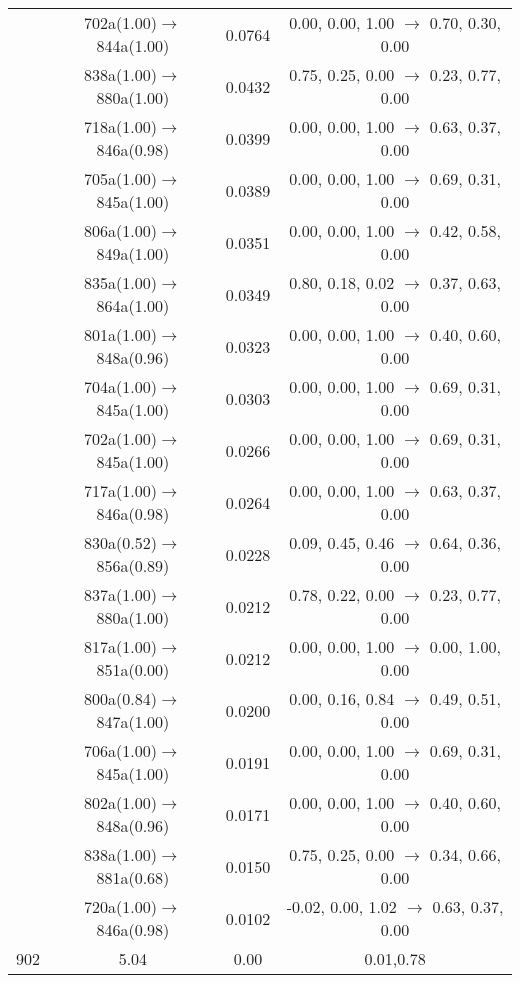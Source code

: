 \documentclass[10pt,a4paper]{article}
\begin{document}
\begin{longtable}{c|c|c|c}
 	& 702a(1.00)$\rightarrow$844a(1.00) &	 0.0764 &	 0.00, 0.00, 1.00 $\rightarrow$ 0.70, 0.30, 0.00 \\ 
 	& 838a(1.00)$\rightarrow$880a(1.00) &	 0.0432 &	 0.75, 0.25, 0.00 $\rightarrow$ 0.23, 0.77, 0.00 \\ 
 	& 718a(1.00)$\rightarrow$846a(0.98) &	 0.0399 &	 0.00, 0.00, 1.00 $\rightarrow$ 0.63, 0.37, 0.00 \\ 
 	& 705a(1.00)$\rightarrow$845a(1.00) &	 0.0389 &	 0.00, 0.00, 1.00 $\rightarrow$ 0.69, 0.31, 0.00 \\ 
 	& 806a(1.00)$\rightarrow$849a(1.00) &	 0.0351 &	 0.00, 0.00, 1.00 $\rightarrow$ 0.42, 0.58, 0.00 \\ 
 	& 835a(1.00)$\rightarrow$864a(1.00) &	 0.0349 &	 0.80, 0.18, 0.02 $\rightarrow$ 0.37, 0.63, 0.00 \\ 
 	& 801a(1.00)$\rightarrow$848a(0.96) &	 0.0323 &	 0.00, 0.00, 1.00 $\rightarrow$ 0.40, 0.60, 0.00 \\ 
 	& 704a(1.00)$\rightarrow$845a(1.00) &	 0.0303 &	 0.00, 0.00, 1.00 $\rightarrow$ 0.69, 0.31, 0.00 \\ 
 	& 702a(1.00)$\rightarrow$845a(1.00) &	 0.0266 &	 0.00, 0.00, 1.00 $\rightarrow$ 0.69, 0.31, 0.00 \\ 
 	& 717a(1.00)$\rightarrow$846a(0.98) &	 0.0264 &	 0.00, 0.00, 1.00 $\rightarrow$ 0.63, 0.37, 0.00 \\ 
 	& 830a(0.52)$\rightarrow$856a(0.89) &	 0.0228 &	 0.09, 0.45, 0.46 $\rightarrow$ 0.64, 0.36, 0.00 \\ 
 	& 837a(1.00)$\rightarrow$880a(1.00) &	 0.0212 &	 0.78, 0.22, 0.00 $\rightarrow$ 0.23, 0.77, 0.00 \\ 
 	& 817a(1.00)$\rightarrow$851a(0.00) &	 0.0212 &	 0.00, 0.00, 1.00 $\rightarrow$ 0.00, 1.00, 0.00 \\ 
 	& 800a(0.84)$\rightarrow$847a(1.00) &	 0.0200 &	 0.00, 0.16, 0.84 $\rightarrow$ 0.49, 0.51, 0.00 \\ 
 	& 706a(1.00)$\rightarrow$845a(1.00) &	 0.0191 &	 0.00, 0.00, 1.00 $\rightarrow$ 0.69, 0.31, 0.00 \\ 
 	& 802a(1.00)$\rightarrow$848a(0.96) &	 0.0171 &	 0.00, 0.00, 1.00 $\rightarrow$ 0.40, 0.60, 0.00 \\ 
 	& 838a(1.00)$\rightarrow$881a(0.68) &	 0.0150 &	 0.75, 0.25, 0.00 $\rightarrow$ 0.34, 0.66, 0.00 \\ 
 	& 720a(1.00)$\rightarrow$846a(0.98) &	 0.0102 &	 -0.02, 0.00, 1.02 $\rightarrow$ 0.63, 0.37, 0.00 \\ 
 \hline902 &	 5.04 &	 0.00 &	 0.01,0.78 \\ 

\end{longtable}
\end{document}
